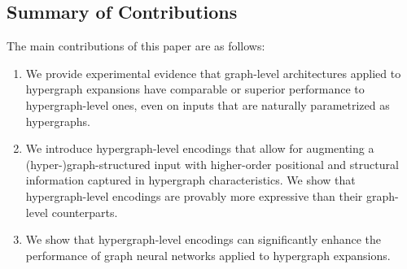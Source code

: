 \subsection{Summary of Contributions}
The main contributions of this paper are as follows:
\vspace*{-4pt}
\begin{enumerate}
\setlength{\itemsep}{2pt}
\vspace*{-4pt}
    \item We provide experimental evidence that graph-level architectures applied to hypergraph expansions have comparable or superior performance to hypergraph-level ones, even on inputs that are naturally parametrized as hypergraphs.
    \item We introduce hypergraph-level encodings that allow for augmenting a (hyper-)graph-structured input with higher-order positional and structural information captured in hypergraph characteristics. We show that hypergraph-level encodings are provably more expressive than their graph-level counterparts.
    \item We show that hypergraph-level encodings can significantly enhance the performance of graph neural networks applied to hypergraph expansions.
\end{enumerate}

